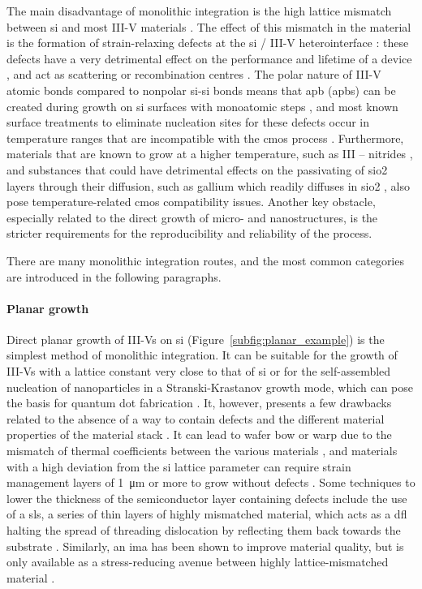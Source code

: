 The main disadvantage of monolithic integration is the high lattice mismatch between \acl{si} and most III-V materials \cite{Kuech2016}. The effect of this mismatch in the material is the formation of strain-relaxing defects at the \acl{si} / III-V heterointerface \cite{Kunert2018, Shi2021}: these defects have a very detrimental effect on the performance and lifetime of a device \cite{Mahajan2000, Zenari2021}, and act as scattering or recombination centres \cite{Jeon2015}. The polar nature of III-V atomic bonds compared to nonpolar \acs{si}-\acs{si} bonds means that \acl{apb} (\acs{apb}s) can be created during growth on \acl{si} surfaces with monoatomic steps \cite{Kunert2018}, and most known surface treatments to eliminate nucleation sites for these defects occur in temperature ranges that are incompatible with the \acs{cmos} process \cite{Laracuente2003, Kunert2018, Miller2000}. Furthermore, materials that are known to grow at a higher temperature, such as III – nitrides \cite{Huang2017}, and substances that could have detrimental effects on the passivating of \acf{sio2} layers through their diffusion, such as gallium \cite{Miller2000} which readily diffuses in \acl{sio2} \cite{VanOmmen1987}, also pose temperature-related \acs{cmos} compatibility issues. Another key obstacle, especially related to the direct growth of micro- and nanostructures, is the stricter requirements for the reproducibility and reliability of the process.

There are many monolithic integration routes, and the most common categories are introduced in the following paragraphs.

\paragraph{Planar growth} Direct planar growth of III-Vs on \acl{si} (Figure~\ref{subfig:planar_example}) is the simplest method of monolithic integration. It can be suitable for the growth of III-Vs with a lattice constant very close to that of \acl{si} or for the self-assembled nucleation of nanoparticles in a Stranski-Krastanov growth mode, which can pose the basis for quantum dot fabrication \cite{Shi2016, Reithmaier2016}. It, however, presents a few drawbacks related to the absence of a way to contain defects and the different material properties of the material stack \cite{Ravash2012}. It can lead to wafer bow or warp due to the mismatch of thermal coefficients between the various materials \cite{Miyoshi2016, Wang2017_2}, and materials with a high deviation from the \acl{si} lattice parameter can require strain management layers of \qty{1}{\micro\metre} or more to grow without defects \cite{Wang2017_2, Cantoro2012, Huang2022}. Some techniques to lower the thickness of the semiconductor layer containing defects include the use of a \acf{sls}, a series of thin layers of highly mismatched material, which acts as a \acf{dfl} halting the spread of threading dislocation by reflecting them back towards the substrate \cite{Kunert2018, Yamaguchi1989, Nozawa1992}. Similarly, an \acf{ima} has been shown to improve material quality, but is only available as a stress-reducing avenue between highly lattice-mismatched material \cite{Huang2009, Jasik2018}. 
\par

